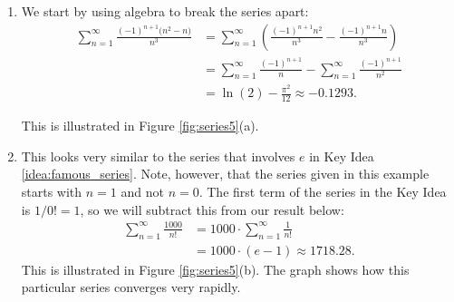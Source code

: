 {\begin{enumerate}
\item	We start by using algebra to break the series apart:
\begin{align*}
\sum_{n=1}^\infty \frac{(-1)^{n+1}\big(n^2-n\big)}{n^3} &= \sum_{n=1}^\infty\left(\frac{(-1)^{n+1}n^2}{n^3}-\frac{(-1)^{n+1}n}{n^3}\right) \\
						&= \sum_{n=1}^\infty\frac{(-1)^{n+1}}{n}-\sum_{n=1}^\infty\frac{(-1)^{n+1}}{n^2} \\
						&= \ln(2) - \frac{\pi^2}{12}	\approx	-0.1293.
\end{align*}

This is illustrated in Figure \ref{fig:series5}(a).

\item		This looks very similar to the series that involves $e$ in Key Idea \ref{idea:famous_series}. Note, however, that the series given in this example starts with $n=1$ and not $n=0$. The first term of the series in the Key Idea is $1/0! = 1$, so we will subtract this from our result below:
\begin{align*}
		\sum_{n=1}^\infty \frac{1000}{n!} &= 1000\cdot\sum_{n=1}^\infty \frac{1}{n!} \\
							&= 1000\cdot (e-1) \approx  1718.28.
\end{align*}
This is illustrated in Figure \ref{fig:series5}(b). The graph shows how this particular series converges very rapidly.


\end{enumerate}}
